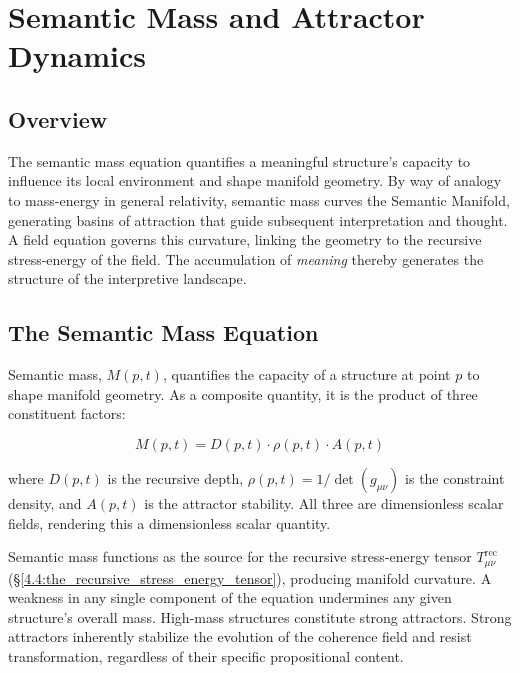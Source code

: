 \chapter{Semantic Mass and Attractor Dynamics}
\label{5:semantic_mass_and_attractor_dynamics}


\section{Overview}
\label{5.1:overview}

The semantic mass equation quantifies a meaningful structure's capacity to influence its local environment and shape manifold geometry. By way of analogy to mass-energy in general relativity, semantic mass curves the Semantic Manifold, generating basins of attraction that guide subsequent interpretation and thought. A field equation governs this curvature, linking the geometry to the recursive stress-energy of the field. The accumulation of \textit{meaning} thereby generates the structure of the interpretive landscape.


\section{The Semantic Mass Equation}
\label{5.2:the_semantic_mass_equation}

Semantic mass, \(M(p,t)\), quantifies the capacity of a structure at point \(p\) to shape manifold geometry. As a composite quantity, it is the product of three constituent factors:

\begin{equation}
M(p, t) = D(p, t) \cdot \rho(p, t) \cdot A(p, t)
\end{equation}

where \(D(p, t)\) is the recursive depth, \(\rho(p, t) = 1/\det(g_{\mu\nu})\) is the constraint density, and \(A(p, t)\) is the attractor stability. All three are dimensionless scalar fields, rendering this a dimensionless scalar quantity. 

Semantic mass functions as the source for the recursive stress-energy tensor \(T^{\text{rec}}_{\mu\nu}\) (\S\ref{4.4:the_recursive_stress_energy_tensor}), producing manifold curvature. A weakness in any single component of the equation undermines any given structure's overall mass. High-mass structures constitute strong attractors. Strong attractors inherently stabilize the evolution of the coherence field and resist transformation, regardless of their specific propositional content.

